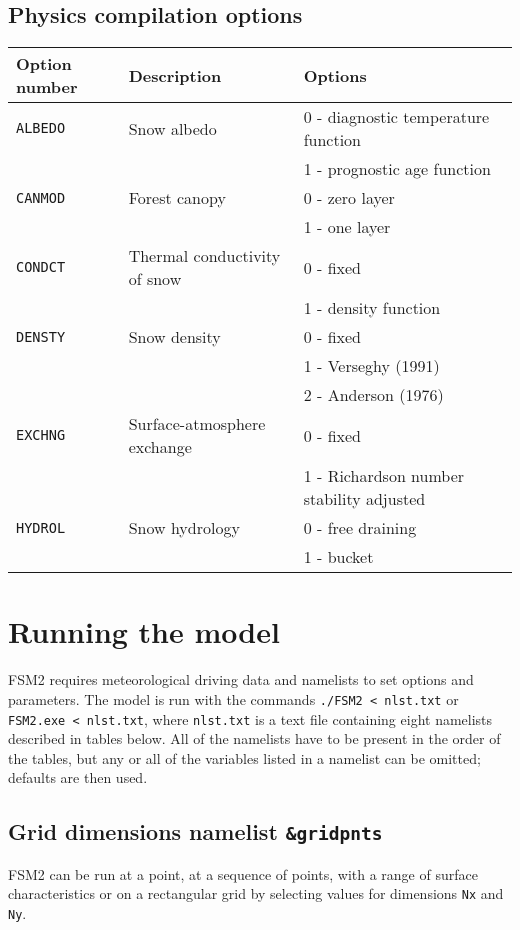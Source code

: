 \documentclass{article}
\begin{document}
\subsection*{Physics compilation options }
\begin{tabular}{|l|l|l|}
\hline
Option number & Description & Options \\
\hline
{\tt ALBEDO} & Snow albedo
& 0 - diagnostic temperature function \\
& & 1 - prognostic age function \\
\hline
{\tt CANMOD} & Forest canopy
& 0 - zero layer \\
& & 1 - one layer \\
\hline
{\tt CONDCT} & Thermal conductivity of snow
& 0 - fixed \\
& & 1 - density function \\
\hline
{\tt DENSTY} & Snow density
& 0 - fixed \\
& & 1 - Verseghy (1991) \\
& & 2 - Anderson (1976) \\
\hline
{\tt EXCHNG} & Surface-atmosphere exchange
& 0 - fixed \\
& & 1 - Richardson number stability adjusted \\
\hline
{\tt HYDROL} & Snow hydrology
& 0 - free draining \\
& & 1 - bucket \\ 
\hline
\end{tabular}

\section{Running the model}

FSM2 requires meteorological driving data and namelists to set options and parameters. The model is run with the commands {\tt ./FSM2 < nlst.txt} or {\tt FSM2.exe < nlst.txt}, where {\tt nlst.txt} is a text file containing eight namelists described in tables below. All of the namelists have to be present in the order of the tables, but any or all of the variables listed in a namelist can be omitted; defaults are then used.



\subsection*{Grid dimensions namelist {\tt \&gridpnts}}
FSM2 can be run at a point, at a sequence of points, with a range of surface characteristics or on a rectangular grid by selecting values for dimensions {\tt Nx} and {\tt Ny}. 
\end{document}
